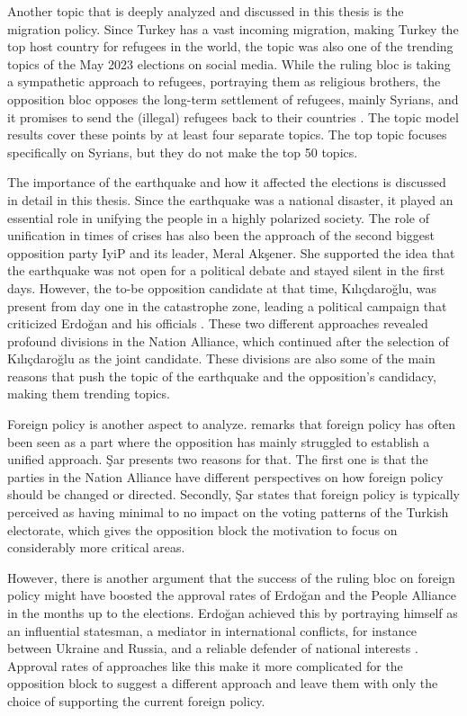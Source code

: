Another topic that is deeply analyzed and discussed in this thesis is the migration policy. Since Turkey has 
a vast incoming migration, making Turkey the top host country for refugees in the world, the topic was also 
one of the trending topics of the May 2023 elections on social media. While the ruling bloc is taking a 
sympathetic approach to refugees, portraying them as religious brothers, the opposition bloc opposes the 
long-term settlement of refugees, mainly Syrians, and it promises to send the (illegal) refugees back to 
their countries \parencite{berk_esen_turkish_politics_2023}. The topic model results cover these points 
by at least four separate topics. The top topic focuses specifically on Syrians, but they do not make 
the top 50 topics.

The importance of the earthquake and how it affected the elections is discussed in detail in this 
thesis. Since the earthquake was a national disaster, it played an essential role in unifying the 
people in a highly polarized society. The role of unification in times of crises has also been the 
approach of the second biggest opposition party \ac{IyiP} and its leader, Meral Akşener. She supported 
the idea that the earthquake was not open for a political debate and stayed silent in the first days. 
However, the to-be opposition candidate at that time, Kılıçdaroğlu, was present from day one in the 
catastrophe zone, leading a political campaign that criticized Erdoğan and his officials
\parencite{cevik_aksoy_turkey_earthquake_2023}. These two different approaches revealed profound 
divi­sions in the Nation Alliance, which continued after the selection of Kılıçdaroğlu as the joint 
candidate. These divisions are also some of the main reasons that push the topic of the earthquake 
and the opposition's candidacy, making them trending topics. 

Foreign policy is another aspect to analyze. \textcite{edgar_sar_opposition_election_agenda_2023} remarks 
that foreign policy has often been seen as a part where the opposition has mainly struggled to 
establish a unified approach. Şar presents two reasons for that. The first one is that the parties in the 
Nation Alliance have different perspectives on how foreign policy should be changed or directed. 
Secondly, Şar states that foreign policy is typically perceived as having minimal to no impact on the 
voting patterns of the Turkish electorate, which gives the opposition block the motivation to focus on 
considerably more critical areas.

However, there is another argument that the success of the ruling bloc on foreign policy might have 
boosted the approval rates of Erdoğan and the People Alliance in the months up to the elections. 
Erdoğan achieved this by portraying himself as an influential statesman, a mediator in international 
conflicts, for instance between Ukraine and Russia, and a reliable defender of national 
interests \parencite{cevik_aksoy_aydin_turkey_after_elections_2023}. Approval rates of approaches like 
this make it more complicated for the opposition block to suggest a different approach and leave them 
with only the choice of supporting the current foreign policy.

